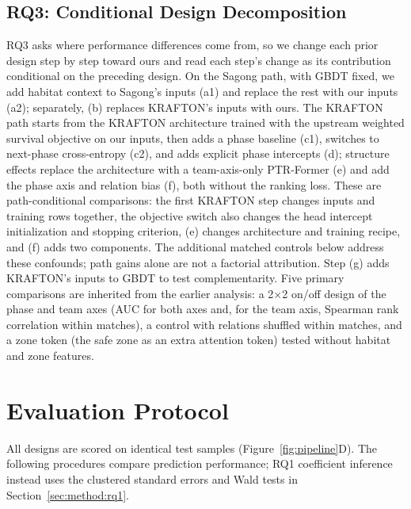 \documentclass[sigconf,anonymous,nonacm]{acmart}
\begin{document}
\subsection{RQ3: Conditional Design Decomposition}
\label{sec:method:decomposition}
RQ3 asks where performance differences come from, so we change each prior design step by step toward ours and read each step's change as its contribution conditional on the preceding design.
On the Sagong path, with GBDT fixed, we add habitat context to Sagong's inputs (a1) and replace the rest with our inputs (a2); separately, (b) replaces KRAFTON's inputs with ours.
The KRAFTON path starts from the KRAFTON architecture trained with the upstream weighted survival objective on our inputs, then adds a phase baseline (c1), switches to next-phase cross-entropy (c2), and adds explicit phase intercepts (d); structure effects replace the architecture with a team-axis-only PTR-Former (e) and add the phase axis and relation bias (f), both without the ranking loss.
These are path-conditional comparisons: the first KRAFTON step changes inputs and training rows together, the objective switch also changes the head intercept initialization and stopping criterion, (e) changes architecture and training recipe, and (f) adds two components. The additional matched controls below address these confounds; path gains alone are not a factorial attribution.
Step (g) adds KRAFTON's inputs to GBDT to test complementarity.
Five primary comparisons are inherited from the earlier analysis: a 2$\times$2 on/off design of the phase and team axes (AUC for both axes and, for the team axis, Spearman rank correlation within matches), a control with relations shuffled within matches, and a zone token (the safe zone as an extra attention token) tested without habitat and zone features.

\section{Evaluation Protocol}
\label{sec:method:evaluation}
All designs are scored on identical test samples (Figure~\ref{fig:pipeline}D). The following procedures compare prediction performance; RQ1 coefficient inference instead uses the clustered standard errors and Wald tests in Section~\ref{sec:method:rq1}.
\end{document}
